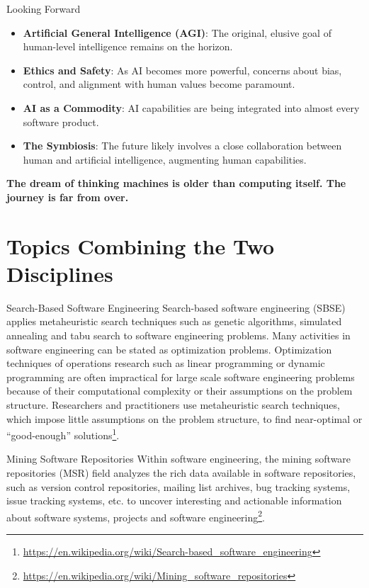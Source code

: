 \documentclass{beamer}
\begin{document}
\begin{frame}[t]{Looking Forward}
\begin{itemize}
    \item \textbf{Artificial General Intelligence (AGI)}: The original, elusive goal of human-level intelligence remains on the horizon.
    \item \textbf{Ethics and Safety}: As AI becomes more powerful, concerns about bias, control, and alignment with human values become paramount.
    \item \textbf{AI as a Commodity}: AI capabilities are being integrated into almost every software product.
    \item \textbf{The Symbiosis}: The future likely involves a close collaboration between human and artificial intelligence, augmenting human capabilities.
\end{itemize}
\begin{center}
    \textbf{The dream of thinking machines is older than computing itself. The journey is far from over.}
\end{center}
\end{frame}

\section{Topics Combining the Two Disciplines}
\begin{frame}[t]{Search-Based Software Engineering}
    Search-based software engineering (SBSE) applies metaheuristic search techniques such as genetic algorithms, simulated annealing and tabu search to software engineering problems. Many activities in software engineering can be stated as optimization problems. Optimization techniques of operations research such as linear programming or dynamic programming are often impractical for large scale software engineering problems because of their computational complexity or their assumptions on the problem structure. Researchers and practitioners use metaheuristic search techniques, which impose little assumptions on the problem structure, to find near-optimal or ``good-enough'' solutions\footnote{\url{https://en.wikipedia.org/wiki/Search-based_software_engineering}}.
\end{frame}

\begin{frame}[t]{Mining Software Repositories}
Within software engineering, the mining software repositories (MSR) field analyzes the rich data available in software repositories, such as version control repositories, mailing list archives, bug tracking systems, issue tracking systems, etc. to uncover interesting and actionable information about software systems, projects and software engineering\footnote{\url{https://en.wikipedia.org/wiki/Mining_software_repositories}}.
\end{frame}
\end{document}
